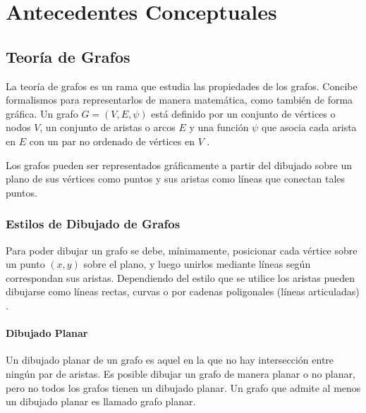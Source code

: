 \chapter{Antecedentes Conceptuales}\label{cap2}

\section{Teoría de Grafos}
\label{sec:teoria_grafos}
La teoría de grafos es un rama que estudia las propiedades de los grafos. Concibe formalismos para representarlos de manera matemática, como también de forma gráfica. Un grafo $G=(V,E,\psi)$ está definido por un conjunto de vértices o nodos $V$, un conjunto de aristas o arcos $E$ y una función $\psi$ que asocia cada arista en $E$ con un par no ordenado de vértices en $V$ \cite{bondy1976graph}\cite{dubinsky1984mathematical}.

Los grafos pueden ser representados gráficamente a partir del dibujado sobre un plano de sus vértices como puntos y sus aristas como líneas que conectan tales puntos. 

\subsection{Estilos de Dibujado de Grafos}
\label{sec:estilos_de_dibujado}
 Para poder dibujar un grafo se debe, mínimamente, posicionar cada vértice sobre un punto $(x,y)$ sobre el plano, y luego unirlos mediante líneas según correspondan sus aristas. Dependiendo del estilo que se utilice los aristas pueden dibujarse como líneas rectas, curvas o por cadenas poligonales (líneas articuladas) \cite{nishizeki2004planar}.
 
\subsubsection{Dibujado Planar}
Un dibujado planar de un grafo es aquel en la que no hay intersección entre ningún par de aristas. Es posible dibujar un grafo de manera planar o no planar, pero no todos los grafos tienen un dibujado planar. Un grafo que admite al menos un dibujado planar es llamado grafo planar.

